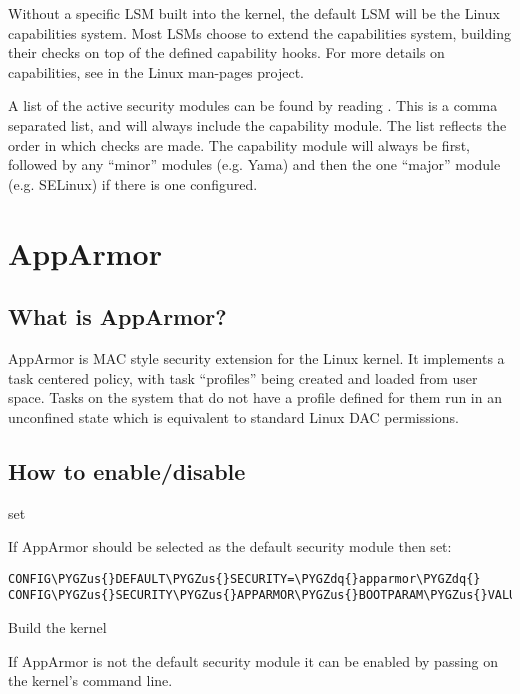 \documentclass[a4paper,8pt,english]{sphinxmanual}
\def\PYGZus{\char`\_}
\def\PYGZdq{\char`\"}
\begin{document}
Without a specific LSM built into the kernel, the default LSM will be the
Linux capabilities system. Most LSMs choose to extend the capabilities
system, building their checks on top of the defined capability hooks.
For more details on capabilities, see  in the Linux
man-pages project.

A list of the active security modules can be found by reading
. This is a comma separated list, and
will always include the capability module. The list reflects the
order in which checks are made. The capability module will always
be first, followed by any ``minor'' modules (e.g. Yama) and then
the one ``major'' module (e.g. SELinux) if there is one configured.


\section{AppArmor}
\label{admin-guide/LSM/apparmor::doc}\label{admin-guide/LSM/apparmor:apparmor}

\subsection{What is AppArmor?}
\label{admin-guide/LSM/apparmor:what-is-apparmor}
AppArmor is MAC style security extension for the Linux kernel.  It implements
a task centered policy, with task ``profiles'' being created and loaded
from user space.  Tasks on the system that do not have a profile defined for
them run in an unconfined state which is equivalent to standard Linux DAC
permissions.


\subsection{How to enable/disable}
\label{admin-guide/LSM/apparmor:how-to-enable-disable}
set 

If AppArmor should be selected as the default security module then set:

\begin{Verbatim}[commandchars=\\\{\}]
CONFIG\PYGZus{}DEFAULT\PYGZus{}SECURITY=\PYGZdq{}apparmor\PYGZdq{}
CONFIG\PYGZus{}SECURITY\PYGZus{}APPARMOR\PYGZus{}BOOTPARAM\PYGZus{}VALUE=1
\end{Verbatim}

Build the kernel

If AppArmor is not the default security module it can be enabled by passing
 on the kernel's command line.
\end{document}
